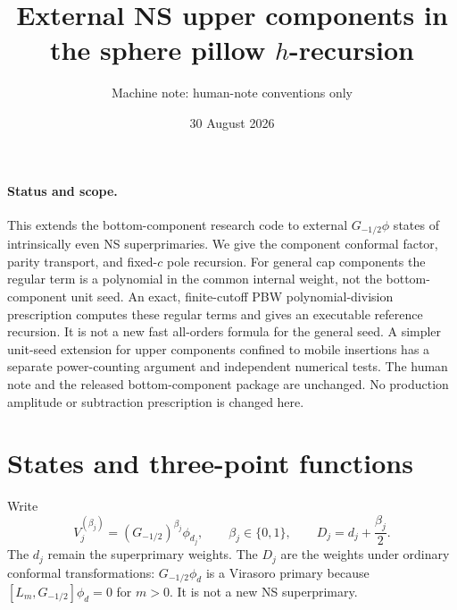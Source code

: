 \documentclass[11pt]{article}
\title{External NS upper components in the sphere pillow $h$-recursion}
\author{Machine note: human-note conventions only}
\date{30 August 2026}
\begin{document}
\maketitle

\paragraph{Status and scope.}
This extends the bottom-component research code to external
$G_{-1/2}\phi$ states of intrinsically even NS superprimaries.  We give
the component conformal factor, parity transport, and fixed-$c$ pole
recursion.  For general cap components the regular term is a polynomial
in the common internal weight, not the bottom-component unit seed.
An exact, finite-cutoff PBW polynomial-division prescription computes
these regular terms and gives an executable reference recursion.  It is
not a new fast all-orders formula for the general seed.  A simpler
unit-seed extension for upper components confined to mobile insertions
has a separate power-counting argument and independent numerical tests.
The human note and the released bottom-component package are unchanged.
No production amplitude or subtraction prescription is changed here.

\section{States and three-point functions}

Write
\begin{equation}
 V_j^{(\beta_j)}=(G_{-1/2})^{\beta_j}\phi_{d_j},\qquad
 \beta_j\in\{0,1\},\qquad D_j=d_j+\frac{\beta_j}{2}.
\end{equation}
The $d_j$ remain the superprimary weights.  The $D_j$ are the weights
under ordinary conformal transformations: $G_{-1/2}\phi_d$ is a
Virasoro primary because $[L_m,G_{-1/2}]\phi_d=0$ for $m>0$.
It is not a new NS superprimary.
\end{document}
